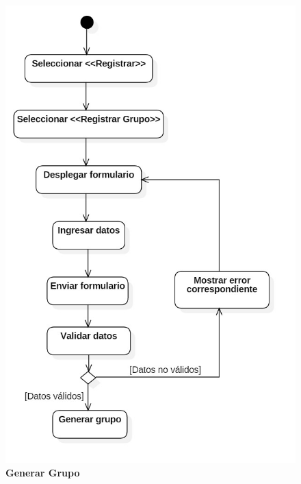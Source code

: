 \begin{figure}[H]
  \centering
    \includegraphics[scale=.65,angle=0]{project/Actividades/A_generar_grupo.jpg}
  \caption{\textbf{Generar Grupo}}
\end{figure}
